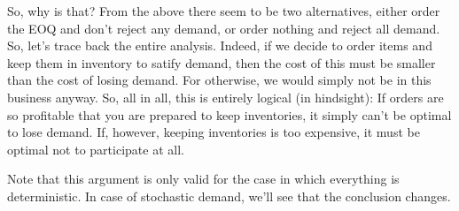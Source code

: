 \begin{uncomment}
\begin{exercise}[\faRocket]
\begin{solution}
So, why is that? From the above there seem to be two alternatives,
either order the EOQ and don't reject any demand, or order nothing and
reject all demand.  So, let's trace back the entire analysis.  Indeed,
if we decide to order items and keep them in inventory to satify
demand, then the cost of this must be smaller than the cost of losing
demand. For otherwise, we would simply not be in this business
anyway. So, all in all, this is entirely logical (in hindsight): If
orders are so profitable that you are prepared to keep inventories, it
simply can't be optimal to lose demand. If, however, keeping
inventories is too expensive, it must be optimal not to participate at
all.

Note that this argument is only valid for the case in which everything
is deterministic. In case of stochastic demand, we'll see that
the conclusion changes.
  \end{solution}
\end{exercise}
\end{uncomment}

\begin{comment}
  We need to replace $D$ by $d$, as we consider deterministic demand here.
\end{comment}









